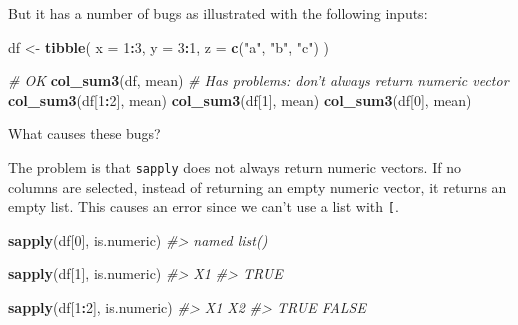 \documentclass[]{book}
\newenvironment{Shaded}{\begin{snugshade}}{\end{snugshade}}
\newcommand{\CommentTok}[1]{\textcolor[rgb]{0.56,0.35,0.01}{\textit{#1}}}
\newcommand{\DataTypeTok}[1]{\textcolor[rgb]{0.13,0.29,0.53}{#1}}
\newcommand{\DecValTok}[1]{\textcolor[rgb]{0.00,0.00,0.81}{#1}}
\newcommand{\KeywordTok}[1]{\textcolor[rgb]{0.13,0.29,0.53}{\textbf{#1}}}
\newcommand{\NormalTok}[1]{#1}
\newcommand{\OperatorTok}[1]{\textcolor[rgb]{0.81,0.36,0.00}{\textbf{#1}}}
\newcommand{\StringTok}[1]{\textcolor[rgb]{0.31,0.60,0.02}{#1}}
\theoremstyle{plain}
\theoremstyle{remark}
\begin{document}
But it has a number of bugs as illustrated with the following inputs:

\begin{Shaded}
\begin{Highlighting}[]
\NormalTok{df <-}\StringTok{ }\KeywordTok{tibble}\NormalTok{(}
  \DataTypeTok{x =} \DecValTok{1}\OperatorTok{:}\DecValTok{3}\NormalTok{,}
  \DataTypeTok{y =} \DecValTok{3}\OperatorTok{:}\DecValTok{1}\NormalTok{,}
  \DataTypeTok{z =} \KeywordTok{c}\NormalTok{(}\StringTok{"a"}\NormalTok{, }\StringTok{"b"}\NormalTok{, }\StringTok{"c"}\NormalTok{)}
\NormalTok{)}

\CommentTok{# OK}
\KeywordTok{col_sum3}\NormalTok{(df, mean)}
\CommentTok{# Has problems: don't always return numeric vector}
\KeywordTok{col_sum3}\NormalTok{(df[}\DecValTok{1}\OperatorTok{:}\DecValTok{2}\NormalTok{], mean)}
\KeywordTok{col_sum3}\NormalTok{(df[}\DecValTok{1}\NormalTok{], mean)}
\KeywordTok{col_sum3}\NormalTok{(df[}\DecValTok{0}\NormalTok{], mean)}
\end{Highlighting}
\end{Shaded}

What causes these bugs?

The problem is that \texttt{sapply} does not always return numeric vectors.
If no columns are selected, instead of returning an empty numeric vector, it returns an empty list.
This causes an error since we can't use a list with \texttt{{[}}.

\begin{Shaded}
\begin{Highlighting}[]
\KeywordTok{sapply}\NormalTok{(df[}\DecValTok{0}\NormalTok{], is.numeric)}
\CommentTok{#> named list()}
\end{Highlighting}
\end{Shaded}

\begin{Shaded}
\begin{Highlighting}[]
\KeywordTok{sapply}\NormalTok{(df[}\DecValTok{1}\NormalTok{], is.numeric)}
\CommentTok{#>   X1 }
\CommentTok{#> TRUE}
\end{Highlighting}
\end{Shaded}

\begin{Shaded}
\begin{Highlighting}[]
\KeywordTok{sapply}\NormalTok{(df[}\DecValTok{1}\OperatorTok{:}\DecValTok{2}\NormalTok{], is.numeric)}
\CommentTok{#>    X1    X2 }
\CommentTok{#>  TRUE FALSE}
\end{Highlighting}
\end{Shaded}
\end{document}

